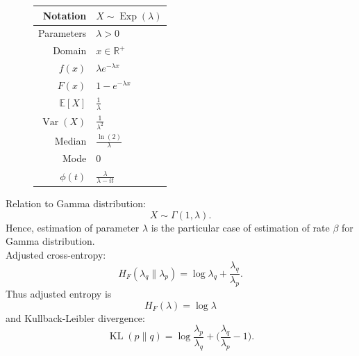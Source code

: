 \documentclass[a4paper,11pt]{article}
\theoremstyle{plain}
\theoremstyle{definition}
\newcommand{\ME}{\mathbb{E}}
\newcommand{\MR}{\mathbb{R}}
\newcommand{\Var}{\operatorname{Var}}
\begin{document}
\begin{figure}[!htb]
\begin{minipage}{0.4\textwidth}
\begin{tabular}{| r | l |}
			\hline
			Notation & $X \sim \operatorname{Exp}(\lambda)$ \\
			\hline
			Parameters & $\lambda > 0$ \\
			\hline
			Domain & $x \in \MR^+$  \\
			\hline
			$f(x)$ & $\lambda e^{-\lambda x}  $ \\
			\hline
			$F(x)$ & $1-e^{-\lambda x} $\\
			\hline
			$\ME[X]$ & $ \frac{1}{\lambda}$ \\
			\hline
			$\Var(X)$ & $\frac{1}{\lambda^2}$ \\
			\hline
			Median & $\frac{\ln(2)}{\lambda}$ \\
			\hline
			Mode & $0$ \\
			\hline
			$\phi(t)$ & $ \frac{\lambda}{\lambda-it}$ \\
			\hline
		\end{tabular}
		\end{minipage}
	\end{figure}

	Relation to Gamma distribution:
	\[X \sim \Gamma(1, \lambda).\]
	Hence, estimation of parameter $\lambda$ is the particular case of estimation of rate $\beta$ for Gamma distribution. \\
	Adjusted cross-entropy:
	\[
	H_F(\lambda_q \| \lambda_p) = \log \lambda_q + \frac{\lambda_q}{\lambda_p}. 
	\]
	Thus adjusted entropy is
	\[
	H_F(\lambda) = \log \lambda
	\]
	and Kullback-Leibler divergence:
	\[
	\operatorname{KL}(p \| q) = \log \frac{\lambda_p}{\lambda_q} + \bigg(\frac{\lambda_q}{\lambda_p} - 1\bigg).
	\]
	
	\pagebreak
\end{document}
